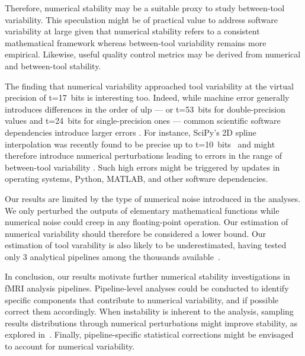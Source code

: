 \documentclass[11pt,onecolumn]{article}
\begin{document}
Therefore, numerical stability may be a suitable proxy to study
between-tool variability. This speculation might be of practical value to
address software variability at large given that numerical stability refers
to a consistent mathematical framework whereas between-tool variability
remains more empirical. Likewise, useful quality control metrics may be derived from numerical and between-tool stability.

The finding that numerical variability approached tool variability at the
virtual precision of t=17~bits is interesting too. Indeed, while machine
error generally introduces differences in the order of   ulp
--- or
t=53~bits for double-precision values and t=24~bits for single-precision
ones --- common scientific software dependencies introduce larger errors
.
For instance, SciPy's 2D spline interpolation was recently found to be
precise up to t=10~bits~\cite{pytracer} 
 and might therefore introduce
numerical perturbations leading to errors in the range of between-tool
variability . Such high errors
might be triggered by updates in operating systems, Python, MATLAB, and
other software dependencies.

Our results are limited by the type of numerical noise introduced in the
analyses. We only perturbed the outputs of elementary
mathematical functions while numerical noise could creep in any
floating-point operation. Our estimation of numerical variability should
therefore be considered a lower bound. Our estimation of tool varability is
also likely to be underestimated, having tested only 3 analytical pipelines
among the thousands available~\cite{carp2012plurality}.

In conclusion, our results motivate further numerical stability
investigations in fMRI analysis pipelines. Pipeline-level analyses could be
conducted to identify specific components that contribute to numerical
variability, and if possible correct them accordingly. When instability is
inherent to the analysis, sampling results distributions through numerical
perturbations might improve stability, as explored in~\cite{kiar2021data}.
Finally, pipeline-specific statistical corrections might be envisaged to
account for numerical variability.
\end{document}
